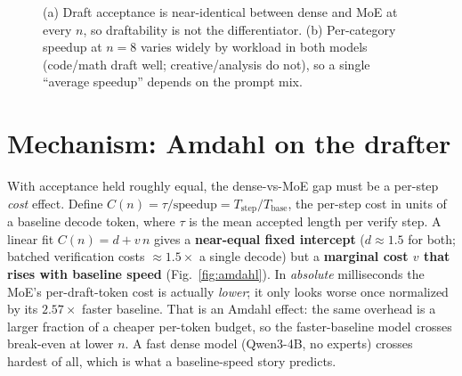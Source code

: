 \documentclass[11pt]{article}
\begin{document}
\begin{figure}[h]
\centering
{}
\caption{(a) Draft acceptance is near-identical between dense and MoE at every $n$, so draftability is not the differentiator.
(b) Per-category speedup at $n{=}8$ varies widely by workload in both models (code/math draft well; creative/analysis do not), so a single
``average speedup'' depends on the prompt mix.}
\label{fig:accept}
\end{figure}

\section{Mechanism: Amdahl on the drafter}\label{sec:mech}
With acceptance held roughly equal, the dense-vs-MoE gap must be a per-step \emph{cost} effect. Define
$C(n)=\tau/\text{speedup}=T_{\text{step}}/T_{\text{base}}$, the per-step cost in units of a baseline decode token, where $\tau$ is the
mean accepted length per verify step. A linear fit $C(n)=d+v\,n$ gives a \textbf{near-equal fixed intercept} ($d\approx1.5$ for both;
batched verification costs $\approx1.5\times$ a single decode) but a \textbf{marginal cost $v$ that rises with baseline speed}
(Fig.~\ref{fig:amdahl}). In \emph{absolute} milliseconds the MoE's per-draft-token cost is actually \emph{lower}; it only looks worse
once normalized by its $2.57\times$ faster baseline. That is an Amdahl effect: the same overhead is a larger fraction of a cheaper
per-token budget, so the faster-baseline model crosses break-even at lower $n$. A fast dense model (Qwen3-4B, no experts) crosses
hardest of all, which is what a baseline-speed story predicts.
\end{document}
